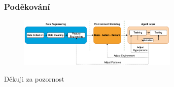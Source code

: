 \begin{frame}
    \frametitle{Poděkování}
    \begin{center}
        \begin{figure}
            \centering
            \includegraphics[width=0.7\textwidth]{img/navrh_reseni}
        \end{figure}
        \vspace{1cm}
        \Huge Děkuji za pozornost
    \end{center}
\end{frame}

